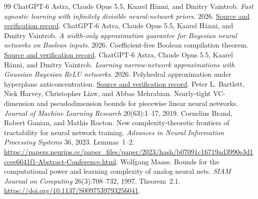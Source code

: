 \documentclass[11pt]{article}
\begin{document}












\appendix






\begin{thebibliography}{99}
 ChatGPT-6 Astra, Claude Opus 5.5, Kaarel H\"anni, and Dmitry Vaintrob. \emph{Fast agnostic learning with infinitely divisible neural-network priors}. 2026. \href{https://github.com/kaarelh/AI-works/tree/main/neural-network-generalization/works-in-progress/agnostic-levy-fanin}{Source and verification record}.
 ChatGPT-6 Astra, Claude Opus 5.5, Kaarel H\"anni, and Dmitry Vaintrob. \emph{A width-only approximation guarantee for Bayesian neural networks on Boolean inputs}. 2026. Coefficient-free Boolean compilation theorem. \href{https://github.com/kaarelh/AI-works/tree/main/neural-network-generalization/works-in-progress/agnostic-width-only-boolean}{Source and verification record}.
 ChatGPT-6 Astra, Claude Opus 5.5, Kaarel H\"anni, and Dmitry Vaintrob. \emph{Learning narrow-network approximations with Gaussian Bayesian ReLU networks}. 2026. Polyhedral approximation under hyperplane anticoncentration. \href{https://github.com/kaarelh/AI-works/tree/main/neural-network-generalization/works-in-progress/agnostic-width-only-regular}{Source and verification record}.
 Peter L. Bartlett, Nick Harvey, Christopher Liaw, and Abbas Mehrabian. Nearly-tight VC-dimension and pseudodimension bounds for piecewise linear neural networks. \emph{Journal of Machine Learning Research} 20(63):1--17, 2019.
 Cornelius Brand, Robert Ganian, and Mathis Rocton. New complexity-theoretic frontiers of tractability for neural network training. \emph{Advances in Neural Information Processing Systems} 36, 2023. Lemmas~1--2. \url{https://papers.neurips.cc/paper_files/paper/2023/hash/b07091c16719ad3990e3d1ccee6641f1-Abstract-Conference.html}.
 Wolfgang Maass. Bounds for the computational power and learning complexity of analog neural nets. \emph{SIAM Journal on Computing} 26(3):708--732, 1997. Theorem~2.1. \url{https://doi.org/10.1137/S0097539793256041}.

\end{thebibliography}
\end{document}
